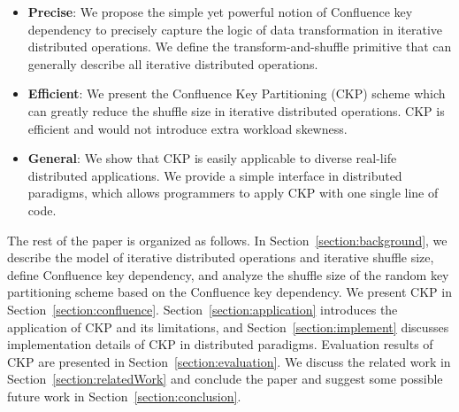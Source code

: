 \documentclass[10pt,journal,compsoc]{IEEEtran}
\begin{document}
\begin{itemize}
\setlength{\itemsep}{0pt}
\setlength{\parskip}{0pt}
\setlength{\parsep}{0pt}
\item \textbf{Precise}: 
We propose the simple yet powerful notion of Confluence key dependency
		to precisely capture the logic of data transformation in
		iterative distributed operations.
We define the transform-and-shuffle primitive that can generally
		describe all iterative distributed operations.

\item \textbf{Efficient}: We present the Confluence Key Partitioning
	(CKP) scheme which can
greatly reduce the shuffle size in iterative distributed operations.
CKP is efficient and would not introduce extra workload skewness. 

\item \textbf{General}: We show that CKP is easily applicable to
	diverse real-life distributed applications.
We provide a simple interface in distributed paradigms, which allows 
programmers to apply CKP with one single line of code.



\end{itemize}


The rest of the paper is organized as follows. 
In Section~\ref{section:background}, 
we describe the model of iterative distributed operations and
iterative shuffle size, define Confluence 
key dependency, and analyze the shuffle size of 
the random key partitioning scheme based on the Confluence key dependency.
We present CKP in Section~\ref{section:confluence}.
Section~\ref{section:application} introduces the application of CKP
and its limitations, 
and Section~\ref{section:implement} discusses 
implementation details of CKP in distributed paradigms.
Evaluation results of CKP are presented in Section~\ref{section:evaluation}. 
We discuss the related work in Section~\ref{section:relatedWork} and
conclude the paper and suggest some possible future work in
Section~\ref{section:conclusion}.
\end{document}
